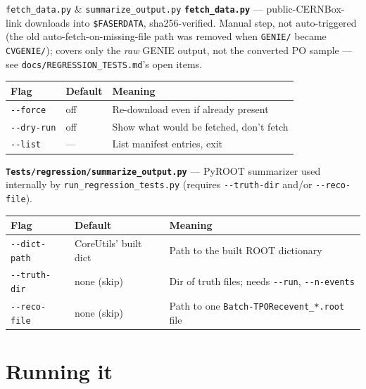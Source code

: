 \documentclass[aspectratio=169]{beamer}
\begin{document}
\begin{frame}{\texttt{fetch\_data.py} \quad \& \quad
    \texttt{summarize\_output.py}}
  \scriptsize
  \textbf{\texttt{fetch\_data.py}} --- public-CERNBox-link downloads into
  \texttt{\$FASERDATA}, sha256-verified. Manual step, not auto-triggered
  (the old auto-fetch-on-missing-file path was removed when
  \texttt{GENIE/} became \texttt{CVGENIE/}); covers only the \emph{raw}
  GENIE output, not the converted PO sample --- see
  \texttt{docs/REGRESSION\_TESTS.md}'s open items.

  \vspace{0.45cm}
  \centering
  \begin{tabular}{@{}p{2.3cm}p{1.6cm}p{6.6cm}@{}}
    \toprule
    \textbf{Flag} & \textbf{Default} & \textbf{Meaning} \\
    \midrule
    \texttt{-{}-force} & off & Re-download even if already present \\
    \texttt{-{}-dry-run} & off & Show what would be fetched, don't fetch \\
    \texttt{-{}-list} & --- & List manifest entries, exit \\
    \bottomrule
  \end{tabular}

  \vspace{0.4cm}
  \raggedright
  \textbf{\texttt{Tests/regression/summarize\_output.py}} --- PyROOT
  summarizer used internally by \texttt{run\_regression\_tests.py}
  (requires \texttt{-{}-truth-dir} and/or \texttt{-{}-reco-file}).

  \vspace{0.45cm}
  \centering
  \begin{tabular}{@{}p{2.3cm}p{2.6cm}p{5.6cm}@{}}
    \toprule
    \textbf{Flag} & \textbf{Default} & \textbf{Meaning} \\
    \midrule
    \texttt{-{}-dict-path} & CoreUtils' built dict & Path to the built ROOT
      dictionary \\
    \texttt{-{}-truth-dir} & none (skip) & Dir of truth files; needs
      \texttt{-{}-run}, \texttt{-{}-n-events} \\
    \texttt{-{}-reco-file} & none (skip) & Path to one
      \texttt{Batch-TPORecevent\_*.root} file \\
    \bottomrule
  \end{tabular}
\end{frame}

\section{Running it}
\end{document}
